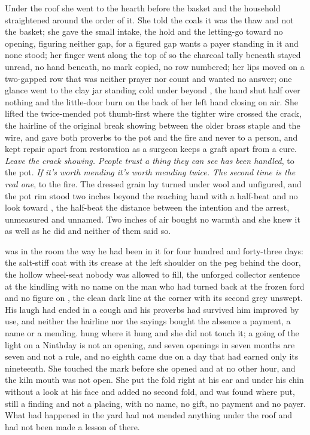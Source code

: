 Under the roof she went to the hearth before the basket and the household straightened around the order of it. She told the coals it was the thaw and not the basket; she gave the small intake, the hold and the letting-go toward no opening, figuring neither gap, for a figured gap wants a payer standing in it and none stood; her finger went along the top of  so the charcoal tally beneath stayed unread, no hand beneath, no mark copied, no row numbered; her lips moved on a two-gapped row that was neither prayer nor count and wanted no answer; one glance went to the clay jar standing cold under  beyond , the hand shut half over nothing and the little-door burn on the back of her left hand closing on air. She lifted the twice-mended pot thumb-first where the tighter wire crossed the crack, the hairline of the original break showing between the older brass staple and the wire, and gave both proverbs to the pot and the fire and never to a person, and kept repair apart from restoration as a surgeon keeps a graft apart from a cure. \emph{Leave the crack showing. People trust a thing they can see has been handled}, to the pot. \emph{If it's worth mending it's worth mending twice. The second time is the real one}, to the fire. The dressed grain lay turned under wool and unfigured, and the pot rim stood two inches beyond the reaching hand with a half-beat and no look toward , the half-beat the distance between the intention and the arrest, unmeasured and unnamed. Two inches of air bought no warmth and she knew it as well as he did and neither of them said so.

 was in the room the way he had been in it for four hundred and forty-three days: the salt-stiff coat with its crease at the left shoulder on the peg behind the door, the hollow wheel-seat nobody was allowed to fill, the unforged collector sentence at the kindling with no name on the man who had turned back at the frozen ford and no figure on , the clean dark line at the corner with its second grey unswept. His laugh had ended in a cough and his proverbs had survived him improved by use, and neither the hairline nor the sayings bought the absence a payment, a name or a mending.  hung where it hung and she did not touch it; a going of the light on a Ninthday is not an opening, and seven openings in seven months are seven and not a rule, and no eighth came due on a day that had earned only its nineteenth. She touched the mark before she opened  and at no other hour, and the kiln mouth was not open. She put the fold right at his ear and under his chin without a look at his face and added no second fold, and  was found where put, still a finding and not a placing, with no name, no gift, no payment and no payer. What had happened in the yard had not mended anything under the roof and had not been made a lesson of there.

